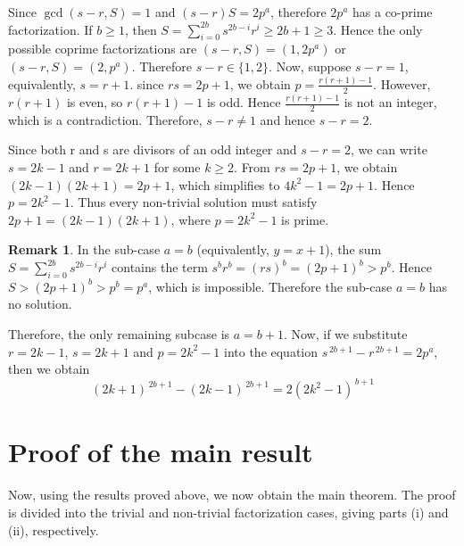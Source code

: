 \documentclass[reqno,12pt]{amsart}
\newtheorem{proposition}[theorem]{Proposition}
\theoremstyle{definition}
\newtheorem{remark}[theorem]{Remark}
\begin{document}
Since $\gcd(s-r,S)=1$ and $(s-r)S=2p^a$, therefore $2p^a$ has a co-prime factorization. 
If $b \ge 1$, then $S= \displaystyle \sum_{i=0}^{2b}s^{2b-i}r^i\ge 2b+1\ge3$. 
Hence the only possible coprime factorizations are $(s-r,S)=(1,2p^a)$ or $(s-r,S)=(2,p^a)$. Therefore $s-r\in\{1,2\}$. 
Now, suppose $s-r=1$, equivalently, $s=r+1$. since $rs=2p+1$, we obtain $p = \frac{r(r+1)-1}{2}$.
However, $r(r+1)$ is even, so $r(r+1)-1$ is odd. Hence $\frac{r(r+1)-1}{2}$ is not an integer, which is a contradiction. Therefore, $s-r\neq1$ and hence $s-r=2$.

Since both r and s are divisors of an odd integer and $s-r=2$,  we can write $s=2k-1$ and $r=2k+1$ for some $k \geq 2$. From $rs=2p+1$, we obtain $(2k-1)(2k+1)=2p+1$, which simplifies to $4k^2-1=2p+1$. 
Hence $p=2k^2-1$. Thus every non-trivial solution must satisfy $2p+1=(2k-1)(2k+1)$, where $p=2k^2-1$ is prime.

\begin{remark}\label{R2.8}
In the sub-case $a=b$ (equivalently, $y=x+1$), the sum $S= \displaystyle \sum_{i=0}^{2b}s^{2b-i}r^i$ contains the term $s^br^b=(rs)^b=(2p+1)^b>p^b$. Hence $S>(2p+1)^b>p^b=p^a$,
which is impossible. Therefore the sub-case $a=b$ has no solution.
\end{remark}

Therefore, the only remaining subcase is $a=b+1$. Now, if we substitute $r=2k-1$, $s=2k+1$ and $p=2k^2-1$ into the equation $s^{\,2b+1}-r^{\,2b+1}=2p^a$, then we obtain
\begin{equation*}
(2k+1)^{\,2b+1}-(2k-1)^{\,2b+1} = 2(2k^2-1)^{\,b+1}	
\end{equation*}

\section{Proof of the main result}
Now, using the results proved above, we now obtain the main theorem. The proof is divided into the trivial and non-trivial factorization cases, giving parts (i) and (ii), respectively.
\end{document}
